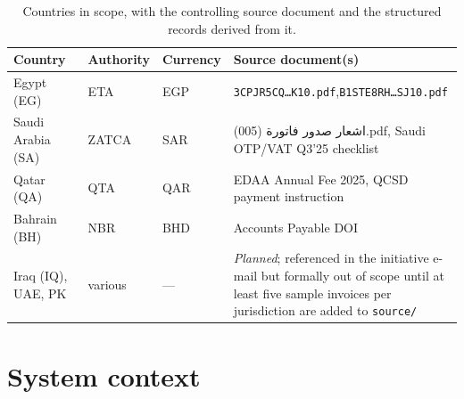\documentclass[11pt,a4paper,twoside]{report}
\newcommand{\ar}[1]{\foreignlanguage{arabic}{#1}}
\begin{document}
\begin{table}[htbp]
\centering
\caption{Countries in scope, with the controlling source document and
the structured records derived from it.}
\label{tab:countries}
\small
\begin{tabularx}{\linewidth}{@{}l l l X@{}}
\toprule
\textbf{Country} & \textbf{Authority} & \textbf{Currency} &
\textbf{Source document(s)} \\ \midrule
Egypt (EG)  & ETA   & EGP &
\texttt{3CPJR5CQ\ldots K10.pdf},\newline\texttt{B1STE8RH\ldots SJ10.pdf} \\
Saudi Arabia (SA) & ZATCA & SAR &
\ar{اشعار صدور فاتورة} (005).pdf, \newline Saudi OTP/VAT Q3'25 checklist \\
Qatar (QA)  & QTA   & QAR &
EDAA Annual Fee 2025, \newline QCSD payment instruction \\
Bahrain (BH) & NBR  & BHD &
Accounts Payable DOI \\
Iraq (IQ), UAE, PK & various & --- &
\emph{Planned}; referenced in the initiative e-mail but formally
out of scope until at least five sample invoices per jurisdiction
are added to \texttt{source/} \\ \bottomrule
\end{tabularx}
\end{table}

\section{System context}
\end{document}
